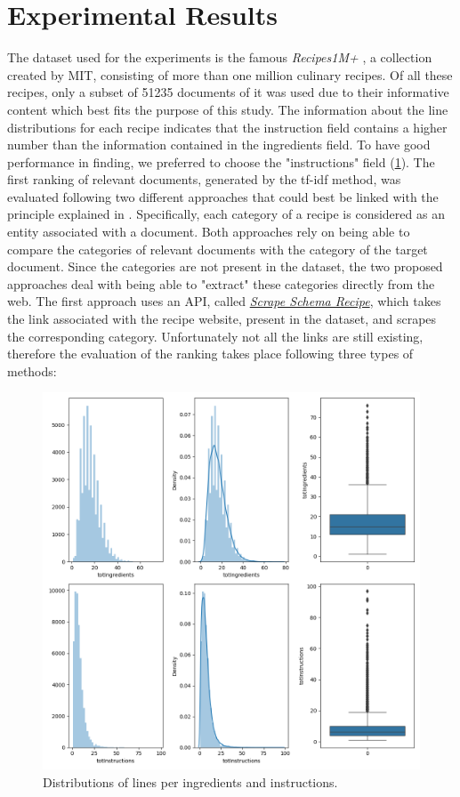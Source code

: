 \section*{Experimental Results}

The dataset used for the experiments is the famous \emph{Recipes1M+} \cite{15}, a collection 
created by MIT, consisting of more than one million culinary recipes. Of 
all these recipes, only a subset of 51235 documents of it was used due to their 
informative content which best fits the purpose of this study. The information 
about the line distributions for each recipe indicates that the instruction 
field contains a higher number than the information contained in the ingredients 
field. To have good performance in finding, we preferred to choose the 
"instructions" field (\ref{distributions}). The first ranking of relevant documents, generated 
by the tf-idf method, was evaluated following two different approaches that 
could best be linked with the principle explained in \cite{16}. Specifically, each 
category of a recipe is considered as an entity associated with a document. 
Both approaches rely on being able to compare the categories of relevant 
documents with the category of the target document. Since the categories 
are not present in the dataset, the two proposed approaches deal with being 
able to "extract" these categories directly from the web. The first approach 
uses an API, called \href{https://pypi.org/project/scrape-schema-recipe/}{\emph{Scrape Schema Recipe}}, which takes the link associated 
with the recipe website, present in the dataset, and scrapes the corresponding 
category. Unfortunately not all the links are still existing, therefore the 
evaluation of the ranking takes place following three types of methods:
\begin{figure}[h!]
    \centering
    \includegraphics[width = 0.7 \linewidth]{images/displot.png}
    \centering
    \caption{Distributions of lines per ingredients and instructions.}
    \label{distributions}
\end{figure}
